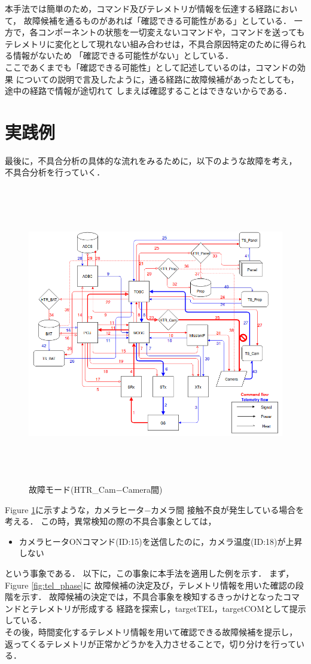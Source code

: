 \documentclass[11pt]{article}
\begin{document}
本手法では簡単のため，コマンド及びテレメトリが情報を伝達する経路において，
故障候補を通るものがあれば「確認できる可能性がある」としている．
一方で，各コンポーネントの状態を一切変えないコマンドや，コマンドを送っても
テレメトリに変化として現れない組み合わせは，不具合原因特定のために得られる情報がないため
「確認できる可能性がない」としている．\\
ここであくまでも「確認できる可能性」として記述しているのは，コマンドの効果
についての説明で言及したように，通る経路に故障候補があったとしても，途中の経路で情報が途切れて
しまえば確認することはできないからである．

\section{実践例}
最後に，不具合分析の具体的な流れをみるために，以下のような故障を考え，
不具合分析を行っていく．\\
\begin{figure}[H]
   \centering
      \includegraphics[height=13.0cm]{figure/fault_mode1.png}
      \caption{故障モード(HTR\_Cam−Camera間)}
      \label{fig:fault_mode1}
\end{figure}
Figure \ref{fig:fault_mode1}に示すような，カメラヒータ−カメラ間
接触不良が発生している場合を考える．
この時，異常検知の際の不具合事象としては，
\begin{itemize}
   \item カメラヒータONコマンド(ID:15)を送信したのに，カメラ温度(ID:18)が上昇しない
\end{itemize}
という事象である．
以下に，この事象に本手法を適用した例を示す．
まず，Figure \ref{fig:tel_phase}に
故障候補の決定及び，テレメトリ情報を用いた確認の段階を示す．
故障候補の決定では，不具合事象を検知するきっかけとなったコマンドとテレメトリが形成する
経路を探索し，targetTEL，targetCOMとして提示している．\\
その後，時間変化するテレメトリ情報を用いて確認できる故障候補を提示し，
返ってくるテレメトリが正常かどうかを入力させることで，切り分けを行っている．
\end{document}
